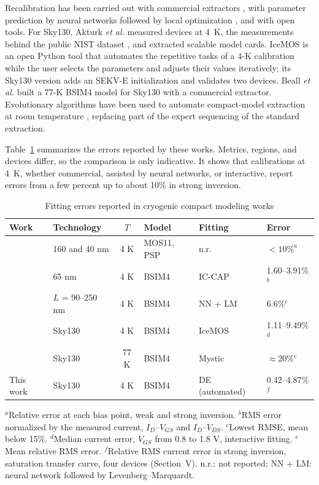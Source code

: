 \documentclass[a4paper,10pt,twoside,twocolumn,final]{JICS_LaTexGuidelines} %
\begin{document}
Recalibration has been carried out with commercial extractors \cite{b19,b21}, with parameter prediction by neural networks followed by local optimization \cite{b20}, and with open tools. For Sky130, Akturk \emph{et al.} \cite{b7} measured devices at 4~K, the measurements behind the public NIST dataset \cite{b15}, and extracted scalable model cards. IceMOS \cite{b5} is an open Python tool that automates the repetitive tasks of a 4-K calibration while the user selects the parameters and adjusts their values iteratively; its Sky130 version \cite{b6} adds an SEKV-E initialization and validates two devices. Beall \emph{et al.} \cite{b21} built a 77-K BSIM4 model for Sky130 with a commercial extractor. Evolutionary algorithms have been used to automate compact-model extraction at room temperature \cite{b25}, replacing part of the expert sequencing of the standard extraction.

Table~\ref{tab:literature} summarizes the errors reported by these works. Metrics, regions, and devices differ, so the comparison is only indicative. It shows that calibrations at 4~K, whether commercial, assisted by neural networks, or interactive, report errors from a few percent up to about 10\% in strong inversion.

\begin{table}[t]\footnotesize
	\centering
	\caption{Fitting errors reported in cryogenic compact modeling works}
	\label{tab:literature}
	\renewcommand{\arraystretch}{1.2}
	\begin{tabular}{|l|l|c|l|l|l|}
		\hline
		\textbf{Work} & \textbf{Technology} & \textbf{$T$} & \textbf{Model} & \textbf{Fitting} & \textbf{Error} \\ \hline
		\cite{b4} & 160 and 40 nm & 4 K & MOS11, PSP & n.r. & $<10\%^{a}$ \\ \hline
		\cite{b19} & 65 nm & 4 K & BSIM4 & IC-CAP & 1.60--3.91\%$^{b}$ \\ \hline
		\cite{b20} & $L$ = 90--250 nm & 4 K & BSIM4 & NN + LM & 6.6\%$^{c}$ \\ \hline
		\cite{b6} & Sky130 & 4 K & BSIM4 & IceMOS & 1.11--9.49\%$^{d}$ \\ \hline
		\cite{b21} & Sky130 & 77 K & BSIM4 & Mystic & $\approx$20\%$^{e}$ \\ \hline
		This work & Sky130 & 4 K & BSIM4 & DE (automated) & 0.42--4.87\%$^{f}$ \\ \hline
	\end{tabular}

	\vspace{1mm}
	\parbox{\textwidth}{\scriptsize $^{a}$Relative error at each bias point, weak and strong inversion. $^{b}$RMS error normalized by the measured current, $I_D$--$V_{GS}$ and $I_D$--$V_{DS}$. $^{c}$Lowest RMSE, mean below 15\%. $^{d}$Median current error, $V_{GS}$ from 0.8 to 1.8 V, interactive fitting. $^{e}$Mean relative RMS error. $^{f}$Relative RMS current error in strong inversion, saturation transfer curve, four devices (Section~V). n.r.: not reported; NN + LM: neural network followed by Levenberg--Marquardt.}
\end{table}
\end{document}
